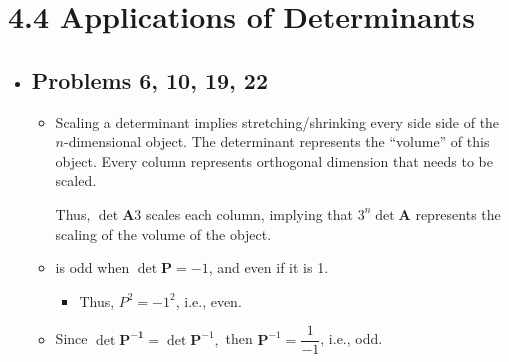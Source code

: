 \section{4.4 Applications of Determinants}
\begin{itemize}
  \item []

  \subsection{Problems 6, 10, 19, 22}
  \begin{enumerate}
    \begin{itemize}\color{foreground}
      \item Scaling a determinant implies stretching/shrinking every side side
        of the \(n\)-dimensional object. The determinant represents the
        ``volume'' of this object. Every column represents orthogonal
        dimension that needs to be scaled.

        Thus, \(\det{\bm{A}}3 \) scales each column, implying that \(3^{n} \det{\bm{A}} \)
        represents the scaling of the volume of the object.
    \end{itemize}

    \begin{itemize}\color{foreground}
      \item {} is odd when \(\det{\bm{P}} = -1 \), and even if it is 1.
        \begin{itemize}
          \item Thus, \(P^2= -1^2\), i.e., even.
        \end{itemize}

      \item Since \(\det{\bm{P^{-1}}} = \det{\bm{P}}^{-1},\) then \(\bm{P}^{-1} = \dfrac{1}{-1} \), i.e., odd.
    \end{itemize}



\end{enumerate}
\end{itemize}
